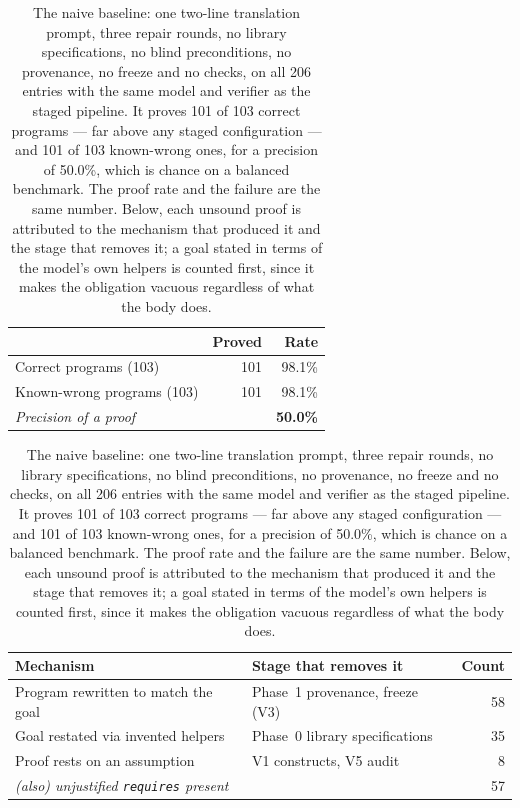 \begin{table}[t]\centering\small
\caption{The naive baseline: one two-line translation prompt, three repair
rounds, no library specifications, no blind preconditions, no provenance, no
freeze and no checks, on all 206 entries with the same model and verifier
as the staged pipeline. It proves 101 of 103 correct programs --- far
above any staged configuration --- and 101 of 103 known-wrong ones,
for a precision of 50.0\%, which is chance on a balanced benchmark. The
proof rate and the failure are the same number. Below, each unsound proof is
attributed to the mechanism that produced it and the stage that removes it;
a goal stated in terms of the model's own helpers is counted first, since it
makes the obligation vacuous regardless of what the body does.}
\label{tab:naive}
\begin{tabular}{lrr}
\toprule
& Proved & Rate \\
\midrule
Correct programs (103) & 101 & 98.1\% \\
Known-wrong programs (103) & 101 & 98.1\% \\
\midrule
\multicolumn{2}{l}{\emph{Precision of a proof}} & \textbf{50.0\%} \\
\bottomrule
\end{tabular}

\vspace{1em}
\begin{tabular}{llr}
\toprule
Mechanism & Stage that removes it & Count \\
\midrule
Program rewritten to match the goal & Phase~1 provenance, freeze (V3) & 58 \\
Goal restated via invented helpers & Phase~0 library specifications & 35 \\
Proof rests on an assumption & V1 constructs, V5 audit & 8 \\
\midrule
\multicolumn{2}{l}{\emph{(also) unjustified \texttt{requires} present}} & 57 \\
\bottomrule
\end{tabular}
\end{table}
